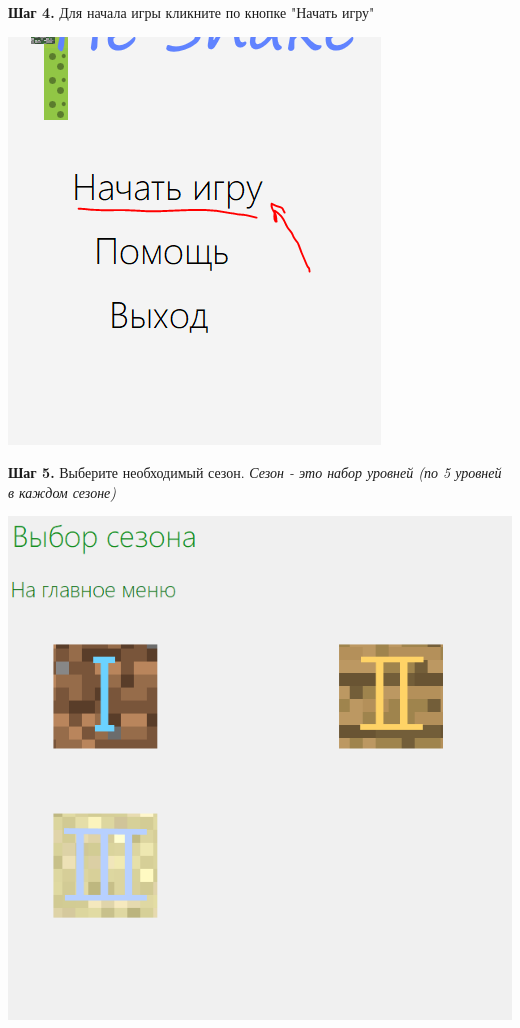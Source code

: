 \documentclass[a4paper,14pt]{extarticle}
\begin{document}
\textbf{Шаг 4.} Для начала игры кликните по кнопке "Начать игру"
\begin{center}
\includegraphics[scale=.9]{img5}
\end{center}

\textbf{Шаг 5.} Выберите необходимый сезон. \textit{Сезон - это набор уровней (по 5 уровней в каждом сезоне)}
\begin{center}
\includegraphics[scale=.9]{img3}
\end{center} 
\end{document}
